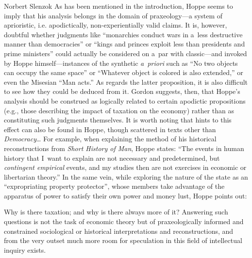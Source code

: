 \begin{artengenv}{Norbert Slenzok}
As has been mentioned in the introduction, Hoppe seems to imply that his analysis belongs in the domain of praxeology---a system of aprioristic, i.e. apodictically, non-experientially valid claims. It is, however, doubtful whether judgments like ``monarchies conduct wars in a~less destructive manner than democracies'' or ``kings and princes exploit less than presidents and prime ministers'' could actually be considered on a~par with classic---and invoked by Hoppe 
\parencite*[][p.xvi]{hoppe_democracy_2007} %
 himself---instances of the synthetic \textit{a~priori} such as ``No two objects can occupy the same space'' or ``Whatever object is colored is also extended,'' or even the Misesian ``Man acts.'' As regards the latter proposition, it is also difficult to see how they could be deduced from it. Gordon 
\parencite*[][p.99]{gordon_austro-libertarian_2017} %
 suggests, then, that Hoppe's analysis should be construed as logically related to certain apodictic propositions (e.g., those describing the impact of taxation on the economy) rather than as constituting such judgments themselves. It is worth noting that hints to this effect can also be found in Hoppe, though scattered in texts other than \textit{Democracy}… For example, when explaining the method of his historical reconstructions from \textit{Short History of Man}, Hoppe 
\parencite*[][p.16]{hoppe_short_2015} %
 states: ``The events in human history that I~want to explain are not necessary and predetermined, but \textit{contingent empirical} events, and my studies then are not exercises in economic or libertarian theory.'' In the same vein, while exploring the nature of the state as an ``expropriating property protector'', whose members take advantage of the apparatus of power to satisfy their own power and money lust, Hoppe 
\parencite*[][p.33]{hoppe_economics_2006} %
 points out:



Why is there taxation; and why is there always more of it? Answering such questions is not the task of economic theory but of praxeologically informed and constrained sociological or historical interpretations and reconstructions, and from the very outset much more room for speculation in this field of intellectual inquiry exists.




\end{artengenv}
